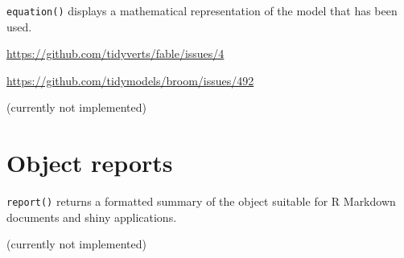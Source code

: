 \documentclass[]{book}
\begin{document}
\texttt{equation()} displays a mathematical representation of the model that has been used.

\url{https://github.com/tidyverts/fable/issues/4}

\url{https://github.com/tidymodels/broom/issues/492}

(currently not implemented)

\hypertarget{object-reports}{%
\section{Object reports}\label{object-reports}}

\texttt{report()} returns a formatted summary of the object suitable for R Markdown documents and shiny applications.

(currently not implemented)
\end{document}
